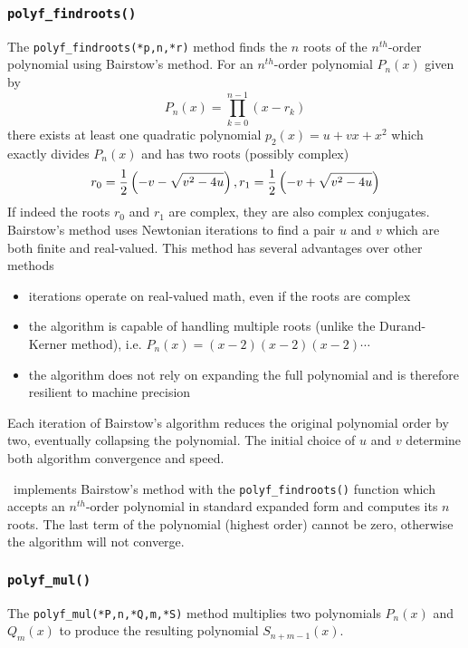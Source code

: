 \subsubsection{{\tt polyf\_findroots()}}
\label{module:math:poly:polyf_findroots}
The {\tt polyf\_findroots(*p,n,*r)} method
finds the $n$ roots of the $n^{th}$-order polynomial using Bairstow's
method.
For an $n^{th}$-order polynomial $P_n(x)$ given by
%
\begin{equation}
\label{eqn:math:poly:roots}
    P_n(x) = \prod_{k=0}^{n-1}{(x-r_k)}
\end{equation}
%
there exists at least one quadratic polynomial $p_{2}(x)=u + vx + x^2$ which
exactly divides $P_{n}(x)$ and has two roots (possibly complex)
%
\begin{equation}
\label{eqn:math:poly:complex_roots}
    r_0 = \frac{1}{2}\left(-v-\sqrt{v^2-4u}\right), \; \\
    r_1 = \frac{1}{2}\left(-v+\sqrt{v^2-4u}\right)
\end{equation}
%
If indeed the roots $r_0$ and $r_1$ are complex, they are also complex
conjugates.
Bairstow's method uses Newtonian iterations to find a pair $u$ and $v$ which
are both finite and real-valued.
This method has several advantages over other methods
\begin{itemize}
\item iterations operate on real-valued math, even if the roots are complex
\item the algorithm is capable of handling multiple roots (unlike the
      Durand-Kerner method), i.e. $P_{n}(x) = (x-2)(x-2)(x-2)\cdots$
\item the algorithm does not rely on expanding the full polynomial and is
      therefore resilient to machine precision
\end{itemize}
Each iteration of Bairstow's algorithm reduces the original polynomial order
by two, eventually collapsing the polynomial.
The initial choice of $u$ and $v$ determine both algorithm convergence and
speed.

\liquid\ implements Bairstow's method with the {\tt polyf\_findroots()}
function which accepts an $n^{th}$-order polynomial in standard expanded form
and computes its $n$ roots.
The last term of the polynomial (highest order) cannot be zero, otherwise the
algorithm will not converge.


\subsubsection{{\tt polyf\_mul()}}
\label{module:math:poly:polyf_mul}
The {\tt polyf\_mul(*P,n,*Q,m,*S)} method
multiplies two polynomials $P_n(x)$ and $Q_m(x)$ to produce the
resulting polynomial $S_{n+m-1}(x)$.



